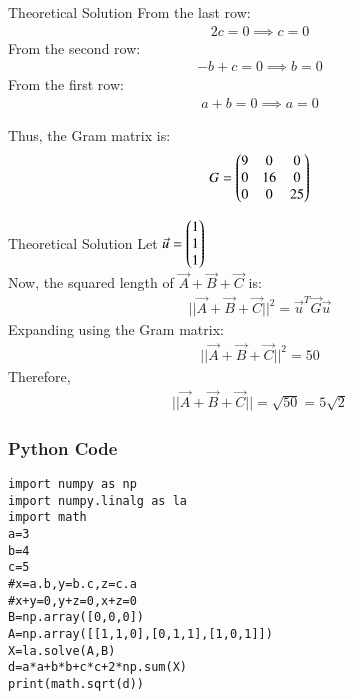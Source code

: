 \documentclass{beamer}
\begin{document}
\begin{frame}{Theoretical Solution}
From the last row:
\begin{align}
2c = 0 \implies c = 0
\end{align}
From the second row:
\begin{align}
- b + c = 0 \implies b = 0
\end{align}
From the first row:
\begin{align}
a + b = 0 \implies a = 0
\end{align}

Thus, the Gram matrix is:
\begin{align}
G = \begin{pmatrix}
9 & 0 & 0 \\
0 & 16 & 0 \\
0 & 0 & 25
\end{pmatrix}
\end{align}
\end{frame}
\begin{frame}{Theoretical Solution}
Let $\Vec{u}=\begin{pmatrix}1 \\ 1 \\ 1\end{pmatrix}$\\
Now, the squared length of $\Vec{A} + \Vec{B} + \Vec{C}$ is:
\begin{align}
||\Vec{A} + \Vec{B} + \Vec{C}||^2 = \Vec{u}^T \Vec{G} \Vec{u}
\end{align}
Expanding using the Gram matrix:
\begin{align}
||\Vec{A} + \Vec{B} + \Vec{C}||^2 = 50
\end{align}
Therefore,
\begin{align}
||\Vec{A} + \Vec{B} + \Vec{C}|| = \sqrt{50} = 5 \sqrt{2}
\end{align}
\end{frame}

\begin{frame}[fragile]
\frametitle{Python Code}
   \begin{lstlisting}
import numpy as np
import numpy.linalg as la
import math
a=3
b=4
c=5
#x=a.b,y=b.c,z=c.a
#x+y=0,y+z=0,x+z=0
B=np.array([0,0,0])
A=np.array([[1,1,0],[0,1,1],[1,0,1]])
X=la.solve(A,B)
d=a*a+b*b+c*c+2*np.sum(X)
print(math.sqrt(d))
   \end{lstlisting}
\end{frame}
\end{document}
